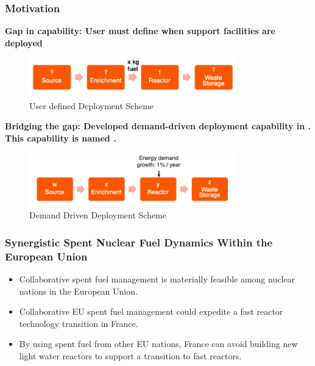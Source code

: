 \begin{frame}
\frametitle{Motivation}

\textbf{Gap in capability: User must define when support facilities are deployed}

\begin{figure}[htbp!]
\begin{center}
	\includegraphics[width=0.8\textwidth]{images/user-deploy}
\end{center}
\caption{User defined Deployment Scheme }
\end{figure}

\textbf{Bridging the gap: Developed demand-driven deployment capability in \Cyclus. This capability is named \deploy.}

\begin{figure}[htbp!]
\begin{center}
	\includegraphics[width=0.8\textwidth]{images/auto-deploy}
\end{center}
\caption{Demand Driven Deployment Scheme}
\end{figure}

\end{frame}

\begin{frame}
\frametitle{Synergistic Spent Nuclear Fuel Dynamics Within the European 
	Union}
\begin{itemize}
	\item Collaborative spent fuel management is materially feasible among nuclear
	nations in the  European Union.
	\item Collaborative EU spent fuel management could expedite a fast reactor
	technology transition in France.
	\item By using spent fuel from other EU nations, France can avoid
	building new light water reactors to support a transition to
	fast reactors.
\end{itemize}
\end{frame}


